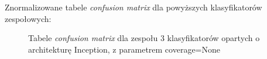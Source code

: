 \documentclass[polish,12pt]{aghthesis}
\begin{document}
\noindent Znormalizowane tabele \textit{confusion matrix} dla powyższych klasyfikatorów zespołowych:
\begin{figure}[H]%
    \begin{adjustbox}{minipage=1.0\paperwidth, pagecenter}
    \centering
    \qquad
    \end{adjustbox}
    \label{fig:inc-ens-3-None-matrices}
    \caption{Tabele \textit{confusion matrix} dla zespołu 3 klasyfikatorów opartych o architekturę Inception, z parametrem coverage=None}
\end{figure}
\end{document}
